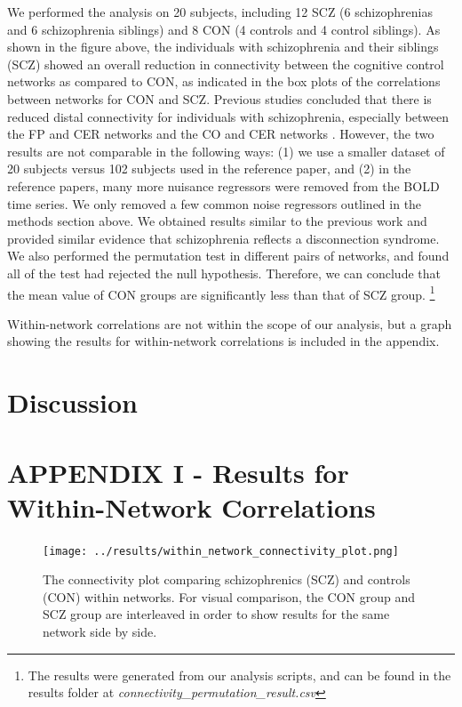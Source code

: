 \documentclass[11pt]{article}
\begin{document}
We performed the analysis on 20 subjects, including 12 SCZ (6 schizophrenias and 6 schizophrenia siblings) and 8 CON (4 controls and 4 control siblings). As shown in the figure above, the individuals with schizophrenia and their siblings (SCZ) showed an overall reduction in connectivity between the cognitive control networks as compared to CON, as indicated in the box plots of the correlations between networks for CON and SCZ. Previous studies concluded that there is reduced distal connectivity for individuals with schizophrenia, especially between the FP and CER networks and the CO and CER networks \cite{repovs2011, repovs2012}. However, the two results are not comparable in the following ways: (1) we use a smaller dataset of 20 subjects versus 102 subjects used in the reference paper, and (2) in the reference papers, many more nuisance regressors were removed from the BOLD time series. We only removed a few common noise regressors outlined in the methods section above. We obtained results similar to the previous work and provided similar evidence that schizophrenia reflects a disconnection syndrome.
We also performed the permutation test in different pairs of networks, and found all of the test had rejected the null hypothesis.  Therefore, we can conclude that the mean value of CON groups are significantly less than that of SCZ group. \footnote{The results were generated from our analysis scripts, and can be found in the results folder at \textit{connectivity\_permutation\_result.csv}}


Within-network correlations are not within the scope of our analysis, but a graph showing the results for within-network correlations is included in the appendix.

\section{Discussion}




\newpage
\appendix

\section{APPENDIX I - Results for Within-Network Correlations}

\begin{figure}[H]
\centering
\texttt{[image: ../results/within\_network\_connectivity\_plot.png]}
\caption{The connectivity plot comparing schizophrenics (SCZ) and controls (CON) within networks. For visual comparison, the CON group and SCZ group are interleaved in order to show results for the same network side by side.}
\end{figure}
\end{document}
